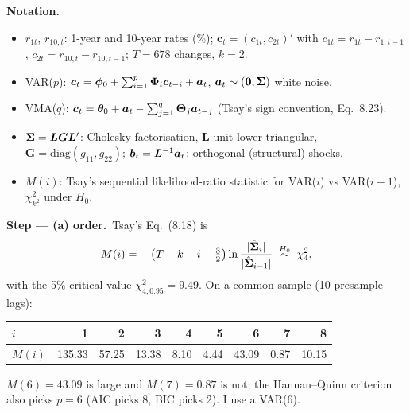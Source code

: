 \documentclass[11pt,a4paper]{article}
\newenvironment{notacao}{\par\smallskip\noindent\textbf{Notation.}\begin{itemize}[leftmargin=1.4em,topsep=1pt,itemsep=0pt]\small}{\end{itemize}}
\newcommand{\passo}[2]{\par\smallskip\noindent\textbf{Step --- #1.}~#2}
\begin{document}
\begin{sol}
\begin{notacao}
\item $r_{1t}$, $r_{10,t}$: 1-year and 10-year rates (\%); $\bm c_t=(c_{1t},c_{2t})'$ with
$c_{1t}=r_{1t}-r_{1,t-1}$, $c_{2t}=r_{10,t}-r_{10,t-1}$; $T=678$ changes, $k=2$.
\item VAR($p$): $\bm c_t=\bm{\phi}_0+\sum_{i=1}^p\bm{\Phi}_i\bm c_{t-i}+\bm{a}_t$, $\bm{a}_t\sim(\bm0,\bm{\Sigma})$ white noise.
\item VMA($q$): $\bm c_t=\bm\theta_0+\bm{a}_t-\sum_{j=1}^q\bm\Theta_j\bm{a}_{t-j}$ (Tsay's sign convention, Eq.~8.23).
\item $\bm{\Sigma}=\bm L\bm G\bm L'$: Cholesky factorisation, $\bm L$ unit lower triangular, $\bm G=\mathrm{diag}(g_{11},g_{22})$;
$\bm{b}_t=\bm L^{-1}\bm{a}_t$: orthogonal (structural) shocks.
\item $M(i)$: Tsay's sequential likelihood-ratio statistic for VAR($i$) vs VAR($i-1$), $\chi^2_{k^2}$ under $H_0$.
\end{notacao}

\passo{(a) order}{Tsay's Eq.~(8.18) is
\begin{equation}
M(i)=-\left(T-k-i-\tfrac32\right)\ln\frac{|\hat{\bm{\Sigma}}_i|}{|\hat{\bm{\Sigma}}_{i-1}|}\;\overset{H_0}{\sim}\;\chi^2_{4},\label{eq:q2M}
\end{equation}
with the 5\% critical value $\chi^2_{4,0.95}=9.49$. On a common sample (10 presample lags):}
\begin{center}\small
\begin{tabular}{lrrrrrrrr}
\toprule
$i$ & 1 & 2 & 3 & 4 & 5 & 6 & 7 & 8\\
\midrule
$M(i)$ & 135.33 & 57.25 & 13.38 & 8.10 & 4.44 & 43.09 & 0.87 & 10.15\\
\bottomrule
\end{tabular}
\end{center}
$M(6)=43.09$ is large and $M(7)=0.87$ is not; the Hannan--Quinn criterion also picks $p=6$ (AIC picks 8,
BIC picks 2). I use a VAR(6).


\end{sol}
\end{document}
